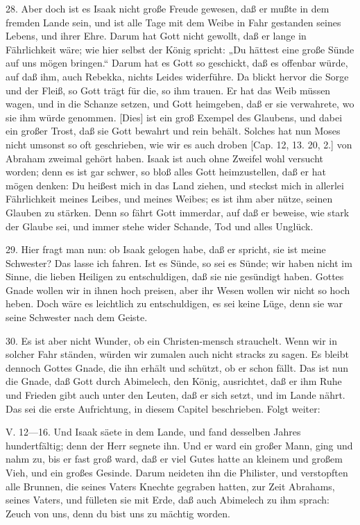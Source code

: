 28. Aber doch ist es Isaak nicht große Freude gewesen, daß er mußte in dem fremden Lande sein, und ist alle Tage mit dem Weibe in Fahr gestanden seines Lebens, und ihrer Ehre. Darum hat Gott nicht gewollt, daß er lange in Fährlichkeit wäre; wie hier selbst der König spricht: „Du hättest eine große Sünde auf uns mögen bringen.“ Darum hat es Gott so geschickt, daß es offenbar würde, auf daß ihm, auch Rebekka, nichts Leides widerführe. Da blickt hervor die Sorge und der Fleiß, so Gott trägt für die, so ihm trauen. Er hat das Weib müssen wagen, und in die Schanze setzen, und Gott heimgeben, daß er sie verwahrete, wo sie ihm würde genommen. [Dies] ist ein groß Exempel des Glaubens, und dabei ein großer Trost, daß sie Gott bewahrt und rein behält. Solches hat nun Moses nicht umsonst so oft geschrieben, wie wir es auch droben [Cap. 12, 13. 20, 2.] von Abraham zweimal gehört haben. Isaak ist auch ohne Zweifel wohl versucht worden; denn es ist gar schwer, so bloß alles Gott heimzustellen, daß er hat mögen denken: Du heißest mich in das Land ziehen, und steckst mich in allerlei Fährlichkeit meines Leibes, und meines Weibes; es ist ihm aber nütze, seinen Glauben zu stärken. Denn so fährt Gott immerdar, auf daß er beweise, wie stark der Glaube sei, und immer stehe wider Schande, Tod und alles Unglück.

29. Hier fragt man nun: ob Isaak gelogen habe, daß er spricht, sie ist meine Schwester? Das lasse ich fahren. Ist es Sünde, so sei es Sünde; wir haben nicht im Sinne, die lieben Heiligen zu entschuldigen, daß sie nie gesündigt haben. Gottes Gnade wollen wir in ihnen hoch preisen, aber ihr Wesen wollen wir nicht so hoch heben. Doch wäre es leichtlich zu entschuldigen, es sei keine Lüge, denn sie war seine Schwester nach dem Geiste.

30. Es ist aber nicht Wunder, ob ein Christen-mensch strauchelt. Wenn wir in solcher Fahr ständen, würden wir zumalen auch nicht stracks zu sagen. Es bleibt dennoch Gottes Gnade, die ihn erhält und schützt, ob er schon fällt. Das ist nun die Gnade, daß Gott durch Abimelech, den König, ausrichtet, daß er ihm Ruhe und Frieden gibt auch unter den Leuten, daß er sich setzt, und im Lande nährt. Das sei die erste Aufrichtung, in diesem Capitel beschrieben. Folgt weiter:

V. 12—16. Und Isaak säete in dem Lande, und fand desselben Jahres hundertfältig; denn der Herr segnete ihn. Und er ward ein großer Mann, ging und nahm zu, bis er fast groß ward, daß er viel Gutes hatte an kleinem und großem Vieh, und ein großes Gesinde. Darum neideten ihn die Philister, und verstopften alle Brunnen, die seines Vaters Knechte gegraben hatten, zur Zeit Abrahams, seines Vaters, und fülleten sie mit Erde, daß auch Abimelech zu ihm sprach: Zeuch von uns, denn du bist uns zu mächtig worden.

